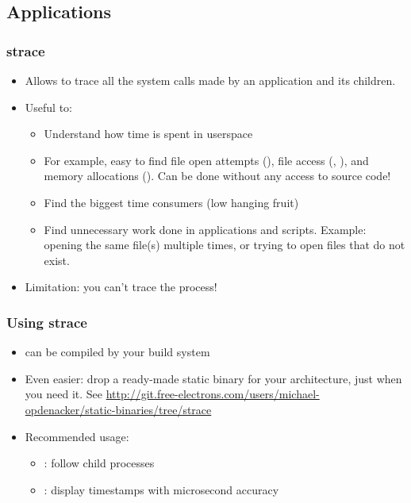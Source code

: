 \subsection{Applications}

\begin{frame}
\frametitle{strace}
\begin{itemize}
	\item Allows to trace all the system calls made by an
              application and its children. 
	\item Useful to:
	\begin{itemize}
		\item Understand how time is spent in userspace
 		\item For example, easy to find file open attempts (),
		      file access (, ), and 
		      memory allocations (). Can be done 
		      without any access to source code!
		\item Find the biggest time consumers
 		      (low hanging fruit)
  		\item Find unnecessary work done in applications
		      and scripts. Example: opening the same file(s)
		      multiple times, or trying to open files that
		      do not exist.
	\end{itemize}
	\item Limitation: you can't trace the  process!
\end{itemize}
\end{frame}

\begin{frame}
\frametitle{Using strace}
\begin{itemize}
	\item {} can be compiled by your build system
	\item Even easier: drop a ready-made static binary for your
	      architecture, just when you need it. See 
	      \url{http://git.free-electrons.com/users/michael-opdenacker/static-binaries/tree/strace}
	\item Recommended usage: \\
        \begin{itemize}
	      \item {}: follow child processes
	      \item {}: display timestamps with microsecond accuracy  
	\end{itemize}
\end{itemize}
\end{frame}

